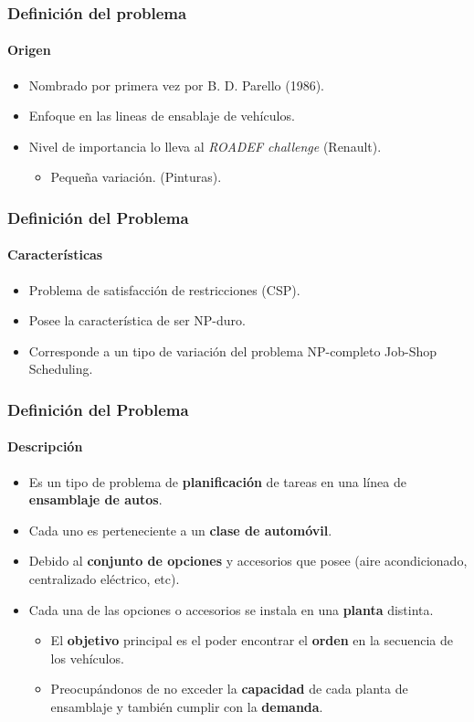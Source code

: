 \frame
{
\frametitle{Definición del problema}
\framesubtitle{Origen}
\begin{itemize}
    \item Nombrado por primera vez por B. D. Parello (1986).
    \item Enfoque en las lineas de ensablaje de vehículos.
    \item Nivel de importancia lo lleva al \emph{ROADEF challenge} (Renault).
    \begin{itemize}
        \item Pequeña variación. (Pinturas).
    \end{itemize}
\end{itemize}
}

\frame
{
\frametitle{Definición del Problema}
\framesubtitle{Características}
\begin{itemize}
    \item Problema de satisfacción de restricciones (CSP).
    \item Posee la característica de ser NP-duro.
    \item Corresponde a un tipo de variación del problema NP-completo Job-Shop Scheduling.
\end{itemize}
}
\frame
{
\frametitle{Definición del Problema}
\framesubtitle{Descripción}
\begin{itemize}
    \item Es un tipo de problema de {\bf planificación} de tareas en una línea de {\bf ensamblaje de autos}.
    \item Cada uno es perteneciente a un {\bf clase de automóvil}.
    \item Debido al {\bf conjunto de opciones} y accesorios que posee (aire acondicionado, centralizado eléctrico, etc).
    \item Cada una de las opciones o accesorios se instala en una {\bf planta} distinta.
    \begin{itemize}
        \item El {\bf objetivo} principal es el poder encontrar el {\bf orden} en la secuencia de los vehículos.
        \item Preocupándonos de no exceder la {\bf capacidad} de cada planta de ensamblaje y también cumplir con la {\bf demanda}.
    \end{itemize}
\end{itemize}
}

